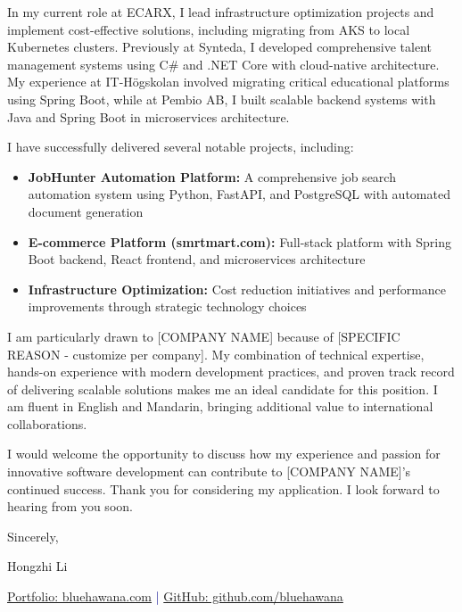 \documentclass[11pt,a4paper]{article}
\begin{document}
\vspace{10pt}

In my current role at ECARX, I lead infrastructure optimization projects and implement cost-effective solutions, including migrating from AKS to local Kubernetes clusters. Previously at Synteda, I developed comprehensive talent management systems using C\# and .NET Core with cloud-native architecture. My experience at IT-Högskolan involved migrating critical educational platforms using Spring Boot, while at Pembio AB, I built scalable backend systems with Java and Spring Boot in microservices architecture.

\vspace{10pt}

I have successfully delivered several notable projects, including:
\begin{itemize}
\item \textbf{JobHunter Automation Platform:} A comprehensive job search automation system using Python, FastAPI, and PostgreSQL with automated document generation
\item \textbf{E-commerce Platform (smrtmart.com):} Full-stack platform with Spring Boot backend, React frontend, and microservices architecture
\item \textbf{Infrastructure Optimization:} Cost reduction initiatives and performance improvements through strategic technology choices
\end{itemize}

\vspace{10pt}

I am particularly drawn to [COMPANY NAME] because of [SPECIFIC REASON - customize per company]. My combination of technical expertise, hands-on experience with modern development practices, and proven track record of delivering scalable solutions makes me an ideal candidate for this position. I am fluent in English and Mandarin, bringing additional value to international collaborations.

\vspace{10pt}

I would welcome the opportunity to discuss how my experience and passion for innovative software development can contribute to [COMPANY NAME]'s continued success. Thank you for considering my application. I look forward to hearing from you soon.

\vspace{15pt}

Sincerely,

\vspace{15pt}

Hongzhi Li

\vspace{10pt}

\textcolor{darkblue}{
\href{https://www.bluehawana.com}{Portfolio: bluehawana.com} | 
\href{https://github.com/bluehawana}{GitHub: github.com/bluehawana}
}
\end{document}
